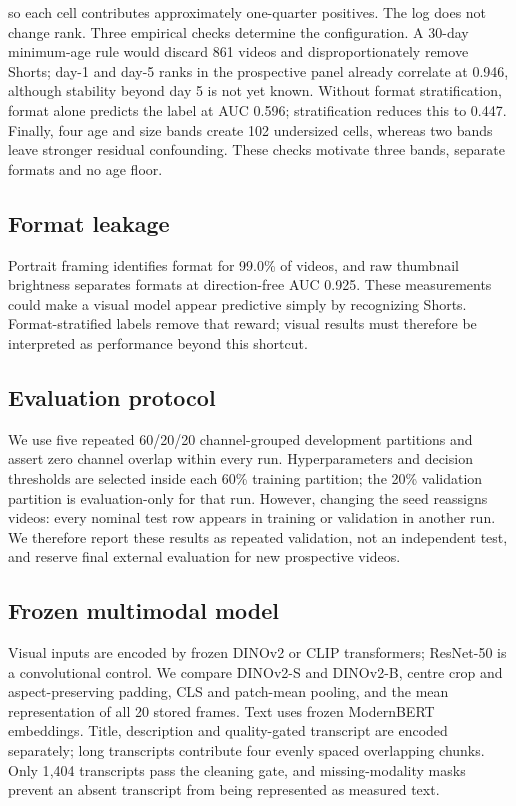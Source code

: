 \documentclass[letterpaper]{article}
\begin{document}
\noindent so each cell contributes approximately one-quarter positives. The log
does not change rank. Three empirical checks determine the configuration. A
30-day minimum-age rule would discard 861 videos and disproportionately remove
Shorts; day-1 and day-5 ranks in the prospective panel already correlate at
0.946, although stability beyond day 5 is not yet known. Without format
stratification, format alone predicts the label at AUC 0.596; stratification
reduces this to 0.447. Finally, four age and size bands create 102 undersized
cells, whereas two bands leave stronger residual confounding. These checks
motivate three bands, separate formats and no age floor.

\subsection{Format leakage}

Portrait framing identifies format for 99.0\% of videos, and raw thumbnail
brightness separates formats at direction-free AUC 0.925. These measurements
could make a visual model appear predictive simply by recognizing Shorts.
Format-stratified labels remove that reward; visual results must therefore be
interpreted as performance beyond this shortcut.

\subsection{Evaluation protocol}

We use five repeated 60/20/20 channel-grouped development partitions and assert
zero channel overlap within every run. Hyperparameters and decision thresholds
are selected inside each 60\% training partition; the 20\% validation partition
is evaluation-only for that run. However, changing the seed reassigns videos:
every nominal test row appears in training or validation in another run. We
therefore report these results as repeated validation, not an independent test,
and reserve final external evaluation for new prospective videos.

\subsection{Frozen multimodal model}

Visual inputs are encoded by frozen DINOv2 or CLIP transformers; ResNet-50 is a
convolutional control. We compare DINOv2-S and DINOv2-B, centre crop and
aspect-preserving padding, CLS and patch-mean pooling, and the mean representation
of all 20 stored frames. Text uses frozen ModernBERT embeddings. Title,
description and quality-gated transcript are encoded separately; long
transcripts contribute four evenly spaced overlapping chunks. Only 1{,}404
transcripts pass the cleaning gate, and missing-modality masks prevent an absent
transcript from being represented as measured text.
\end{document}
